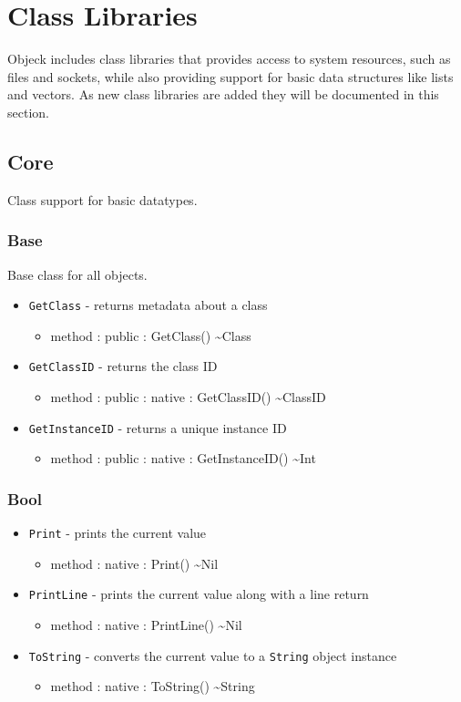 \documentclass[11pt]{article}
\begin{document}
\section{Class Libraries}
Objeck includes class libraries that provides access to system
resources, such as files and sockets, while also providing support for
basic data structures like lists and vectors.  As new class libraries
are added they will be documented in this section.

\subsection{Core}
Class support for basic datatypes.

\subsubsection{Base}
Base class for all objects.
\begin{itemize}
\item \texttt{GetClass} - returns metadata about a class
  \begin{itemize}
  \item method : public : GetClass() \textasciitilde Class
  \end{itemize}
\item \texttt{GetClassID} - returns the class ID
  \begin{itemize}
  \item method : public : native : GetClassID() \textasciitilde ClassID
  \end{itemize}
\item \texttt{GetInstanceID} - returns a unique instance ID
  \begin{itemize}
  \item method : public : native : GetInstanceID() \textasciitilde Int
  \end{itemize}
\end{itemize}

\subsubsection{Bool}
\begin{itemize}
\item \texttt{Print} - prints the current value
  \begin{itemize}
  \item method : native : Print() \textasciitilde Nil
  \end{itemize}
\item \texttt{PrintLine} - prints the current value along with a line
  return
  \begin{itemize}
  \item method : native : PrintLine() \textasciitilde Nil
  \end{itemize}
\item \texttt{ToString} - converts the current value to a
  \texttt{String} object instance
  \begin{itemize}
  \item method : native : ToString() \textasciitilde String
  \end{itemize}
\end{itemize}
\end{document}
